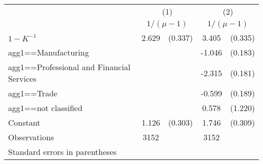 \begin{tabular}{l*{2}{cc}}
\hline\hline
                    &\multicolumn{2}{c}{(1)}  &\multicolumn{2}{c}{(2)}  \\
                    &\multicolumn{2}{c}{$1/(\mu-1)$}&\multicolumn{2}{c}{$1/(\mu-1)$}\\
\hline
$1-K^{-1}$          &       2.629&     (0.337)&       3.405&     (0.335)\\
agg1==Manufacturing &            &            &      -1.046&     (0.183)\\
agg1==Professional and Financial Services&            &            &      -2.315&     (0.181)\\
agg1==Trade         &            &            &      -0.599&     (0.189)\\
agg1==not classified&            &            &       0.578&     (1.220)\\
Constant            &       1.126&     (0.303)&       1.746&     (0.309)\\
\hline
Observations        &        3152&            &        3152&            \\
\hline\hline
\multicolumn{5}{l}{\footnotesize Standard errors in parentheses}\\
\end{tabular}
